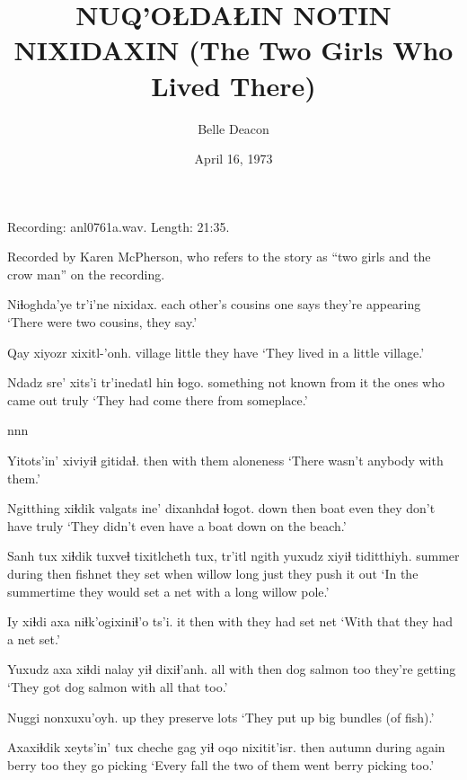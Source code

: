 \documentclass[12pt]{article}
\begin{document}
\title{NUQ'OŁDAŁIN NOTIN NIXIDAXIN \newline(The Two Girls Who Lived There)}

\author{Belle Deacon}

\date{April 16, 1973}

\maketitle

Recording:  anl0761a.wav. Length: 21:35.

Recorded by Karen McPherson, who refers to the story as ``two girls
and the crow man'' on the recording.

\bigskip

\gll Niɬoghda'ye tr'i'ne nixidax. 
{each other's cousins} {one says} {they're appearing}
\glt `There were two cousins, they say.'
\glend

\gll Qay xiyozr xixitl-'onh.
village little {they have}
\glt `They lived in a little village.'
\glend

\gll Ndadz sre' xits'i {tr'inedatl hin} ɬogo.
something {not known} {from it} {the ones who came out} truly
\glt `They had come there from someplace.'
\glend

nnn 

\gll Yitots'in' xiviyiɬ gitidaɬ.
then {with them} aloneness
\glt `There wasn't anybody with them.'
\glend

\gll Ngitthing xiɬdik valgats  ine' dixanhdaɬ ɬogot.
down then boat even {they don't have} truly
\glt `They didn't even have a boat down on the beach.'
\glend

\gll Sanh tux xiɬdik tuxveɬ tixitlcheth tux, tr'itl ngith yuxudz {xiyiɬ tiditthiyh.}
summer during then {fishnet} {they set} when willow long just {they push it out}
\glt `In the summertime they would set a net with a long willow pole.'
\glend

\gll Iy xiɬdi axa niɬk'ogixiniɬ'o ts'i.
it then with {they had set net} {}
\glt `With that they had a net set.'
\glend

\gll Yuxudz axa xiɬdi nalay yiɬ dixiɬ'anh.
all with then {dog salmon} too {they're getting}
\glt `They got dog salmon with all that too.'
\glend

\gll Nuggi nonxuxu'oyh.
up {they preserve lots}
\glt `They put up big bundles (of fish).'
\glend

\gll Axaxiɬdik xeyts'in' tux cheche gag yiɬ {oqo nixitit'isr.}
then autumn during again berry too {they go picking}
\glt `Every fall the two of them went berry picking too.'
\glend
\end{document}
